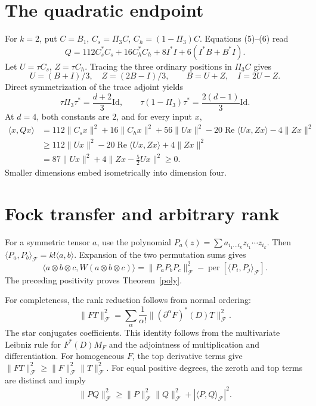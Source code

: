 \documentclass[11pt]{article}
\newcommand{\per}{\operatorname{per}}
\newcommand{\Fock}{\mathcal F}
\begin{document}
\section{The quadratic endpoint}
For \(k=2\), put \(C=B_1\), \(C_s=\Pi_3C\), \(C_h=(1-\Pi_3)C\). Equations (5)--(6) read
\[
 Q=112C_s^*C_s+16C_h^*C_h+8I^*I+6(I^*B+B^*I).
\]
Let \(U=\tau C_s\), \(Z=\tau C_h\). Tracing the three ordinary positions in \(\Pi_3C\) gives
\[
 U=(B+I)/3,\quad Z=(2B-I)/3,\qquad B=U+Z,\quad I=2U-Z.
\]
Direct symmetrization of the trace adjoint yields
\[
 \tau\Pi_3\tau^*=\frac{d+2}{3}\mathrm{Id},\qquad
 \tau(1-\Pi_3)\tau^*=\frac{2(d-1)}{3}\mathrm{Id}.
\]
At \(d=4\), both constants are \(2\), and for every input \(x\),
\[
\begin{split}
 \langle x,Qx\rangle
 &=112\|C_sx\|^2+16\|C_hx\|^2+
   56\|Ux\|^2-20\operatorname{Re}\langle Ux,Zx\rangle-4\|Zx\|^2\\
 &\ge112\|Ux\|^2-20\operatorname{Re}\langle Ux,Zx\rangle+4\|Zx\|^2\\
 &=87\|Ux\|^2+4\|Zx-\tfrac52Ux\|^2\ge0 .
\end{split}
\]
Smaller dimensions embed isometrically into dimension four.

\section{Fock transfer and arbitrary rank}
For a symmetric tensor \(a\), use the polynomial
\(P_a(z)=\sum a_{i_1\ldots i_k}z_{i_1}\cdots z_{i_k}\).
Then \(\langle P_a,P_b\rangle_{\Fock}=k!\langle a,b\rangle\).
Expansion of the two permutation sums gives
\[
 \langle a\otimes b\otimes c,W(a\otimes b\otimes c)\rangle
 =\|P_aP_bP_c\|_{\Fock}^2
       -\per[\langle P_i,P_j\rangle_{\Fock}].
\]
The preceding positivity proves Theorem~\ref{poly}.

For completeness, the rank reduction follows from normal ordering:
\[
 \|FT\|_{\Fock}^2=
 \sum_\alpha\frac1{\alpha!}
       \|(\partial^\alpha F)^*(D)T\|_{\Fock}^2.                 \tag{9}
\]
The star conjugates coefficients. This identity follows from the multivariate Leibniz rule for \(F^*(D)M_F\) and the adjointness of multiplication and differentiation. For homogeneous \(F\), the top derivative terms give
\(\|FT\|_{\Fock}^2\ge\|F\|_{\Fock}^2\|T\|_{\Fock}^2\).
For equal positive degrees, the zeroth and top terms are distinct and imply
\[
 \|PQ\|_{\Fock}^2\ge
 \|P\|_{\Fock}^2\|Q\|_{\Fock}^2+|\langle P,Q\rangle_{\Fock}|^2. \tag{10}
\]
\end{document}
